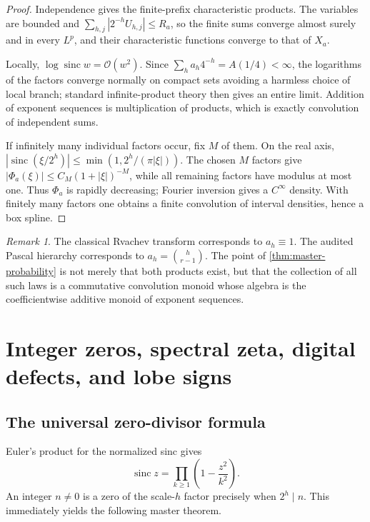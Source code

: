 \documentclass[11pt,oneside]{article}
\numberwithin{equation}{section}
\theoremstyle{definition}
\theoremstyle{remark}
\newtheorem{remark}[theorem]{Remark}
\newcommand{\sinc}{\operatorname{sinc}}
\newcommand{\bigO}{\mathcal O}
\begin{document}
\begin{proof}
Independence gives the finite-prefix characteristic products.  The variables are bounded and
$\sum_{h,j}|2^{-h}U_{h,j}|\le R_a$, so the finite sums converge almost surely and in every
$L^p$, and their characteristic functions converge to that of $X_a$.

Locally, $\log\sinc w=\bigO(w^2)$.  Since
$\sum_ha_h4^{-h}=A(1/4)<\infty$, the logarithms of the factors converge normally on compact
sets avoiding a harmless choice of local branch; standard infinite-product theory then gives
an entire limit.  Addition of exponent sequences is multiplication of products, which is
exactly convolution of independent sums.

If infinitely many individual factors occur, fix $M$ of them.  On the real axis,
$|\sinc(\xi/2^h)|\le\min(1,2^h/(\pi|\xi|))$.  The chosen $M$ factors give
$|\Phi_a(\xi)|\le C_M(1+|\xi|)^{-M}$, while all remaining factors have modulus at most one.
Thus $\Phi_a$ is rapidly decreasing; Fourier inversion gives a $C^\infty$ density.  With
finitely many factors one obtains a finite convolution of interval densities, hence a box
spline.
\end{proof}

\begin{remark}
The classical Rvachev transform corresponds to $a_h\equiv1$.  The audited Pascal hierarchy
corresponds to $a_h=\binom h{r-1}$.  The point of \cref{thm:master-probability} is not merely
that both products exist, but that the collection of all such laws is a commutative
convolution monoid whose algebra is the coefficientwise additive monoid of exponent
sequences.
\end{remark}

\section{Integer zeros, spectral zeta, digital defects, and lobe signs}
\label{sec:spectrum}

\subsection{The universal zero-divisor formula}

Euler's product for the normalized sinc gives
\[
 \sinc z=\prod_{k\ge1}\left(1-\frac{z^2}{k^2}\right).
\]
An integer $n\ne0$ is a zero of the scale-$h$ factor precisely when $2^h\mid n$.
This immediately yields the following master theorem.
\end{document}
